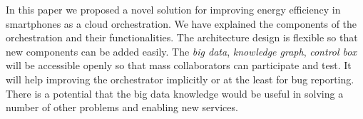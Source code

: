 In this paper we proposed a novel solution for improving energy efficiency in smartphones as a cloud orchestration. We have explained the components of the orchestration and their functionalities. The architecture design is flexible so that new components can be added easily. The \emph{big data}, \emph{knowledge graph}, \emph{control box} will be accessible openly so that mass collaborators can participate and test. It will help improving the orchestrator implicitly or at the least for bug reporting. There is a potential that the big data knowledge would be useful in solving a number of other problems and enabling new services.